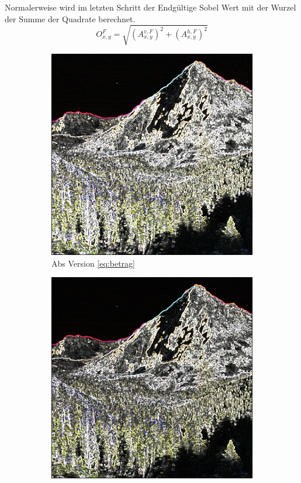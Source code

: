\documentclass[course=erap]{aspdoc}
\begin{document}
\\\\
Normalerweise wird im letzten Schritt der Endgültige Sobel Wert mit der Wurzel der Summe der Quadrate berechnet.
\begin{equation}
    O^{F}_{x,y} = \sqrt{(A^{v,F}_{x,y})^2 + (A^{h,F}_{x,y})^2}
    \label{eq:wurzel}
\end{equation}
\begin{figure}[H]
    \begin{subfigure}{.5\columnwidth}
        \centering
        \includegraphics[width=\columnwidth]{graphics/johnmuirtrail_sobel.png}
        \caption{Abs Version \ref{eq:betrag}}
        \label{fig:abs-bild}
    \end{subfigure}
        \begin{subfigure}{.5\columnwidth}
        \centering
        \includegraphics[width=\columnwidth]{graphics/sqrt_sobel.png}

\end{subfigure}
\end{figure}
\end{document}
